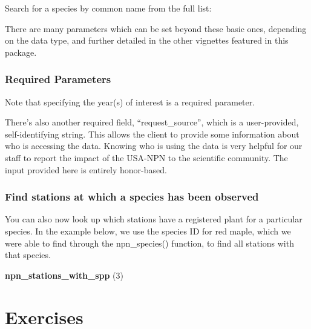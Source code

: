 \documentclass[]{book}
\newenvironment{Shaded}{\begin{snugshade}}{\end{snugshade}}
\newcommand{\DecValTok}[1]{\textcolor[rgb]{0.00,0.00,0.81}{#1}}
\newcommand{\KeywordTok}[1]{\textcolor[rgb]{0.13,0.29,0.53}{\textbf{#1}}}
\newcommand{\NormalTok}[1]{#1}
\newcommand{\OperatorTok}[1]{\textcolor[rgb]{0.81,0.36,0.00}{\textbf{#1}}}
\newcommand{\StringTok}[1]{\textcolor[rgb]{0.31,0.60,0.02}{#1}}
\begin{document}
Search for a species by common name from the full list:

\begin{Shaded}
\end{Shaded}

There are many parameters which can be set beyond these basic ones, depending on the data type, and further detailed in the other vignettes featured in this package.

\hypertarget{required-parameters}{%
\subsubsection{Required Parameters}\label{required-parameters}}

Note that specifying the year(s) of interest is a required parameter.

There's also another required field, ``request\_source'', which is a user-provided, self-identifying string. This allows the client to provide some information about who is accessing the data. Knowing who is using the data is very helpful for our staff to report the impact of the USA-NPN to the scientific community. The input provided here is entirely honor-based.

\hypertarget{find-stations-at-which-a-species-has-been-observed}{%
\subsubsection{Find stations at which a species has been observed}\label{find-stations-at-which-a-species-has-been-observed}}

You can also now look up which stations have a registered plant for a particular species. In the example below, we use the species ID for red maple, which we were able to find through the npn\_species() function, to find all stations with that species.

\begin{Shaded}
\begin{Highlighting}[]
\KeywordTok{npn_stations_with_spp}\NormalTok{ (}\DecValTok{3}\NormalTok{)}
\end{Highlighting}
\end{Shaded}

\hypertarget{exercises}{%
\section{Exercises}\label{exercises}}
\end{document}
